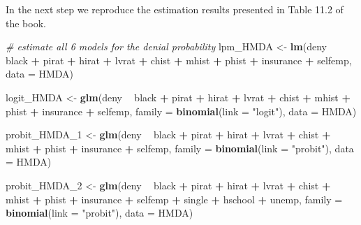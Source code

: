 \documentclass[]{book}
\newenvironment{Shaded}{\begin{snugshade}}{\end{snugshade}}
\newcommand{\KeywordTok}[1]{\textcolor[rgb]{0.13,0.29,0.53}{\textbf{#1}}}
\newcommand{\DataTypeTok}[1]{\textcolor[rgb]{0.13,0.29,0.53}{#1}}
\newcommand{\DecValTok}[1]{\textcolor[rgb]{0.00,0.00,0.81}{#1}}
\newcommand{\StringTok}[1]{\textcolor[rgb]{0.31,0.60,0.02}{#1}}
\newcommand{\CommentTok}[1]{\textcolor[rgb]{0.56,0.35,0.01}{\textit{#1}}}
\newcommand{\OperatorTok}[1]{\textcolor[rgb]{0.81,0.36,0.00}{\textbf{#1}}}
\newcommand{\NormalTok}[1]{#1}
\theoremstyle{definition}
\theoremstyle{definition}
\theoremstyle{definition}
\theoremstyle{remark}
\begin{document}
In the next step we reproduce the estimation results presented in Table
11.2 of the book.

\begin{Shaded}
\begin{Highlighting}[]
\CommentTok{# estimate all 6 models for the denial probability}
\NormalTok{lpm_HMDA <-}\StringTok{ }\KeywordTok{lm}\NormalTok{(deny }\OperatorTok{~}\StringTok{ }\NormalTok{black }\OperatorTok{+}\StringTok{ }\NormalTok{pirat }\OperatorTok{+}\StringTok{ }\NormalTok{hirat }\OperatorTok{+}\StringTok{ }\NormalTok{lvrat }\OperatorTok{+}\StringTok{ }\NormalTok{chist }\OperatorTok{+}\StringTok{ }\NormalTok{mhist }\OperatorTok{+}\StringTok{ }\NormalTok{phist }
               \OperatorTok{+}\StringTok{ }\NormalTok{insurance }\OperatorTok{+}\StringTok{ }\NormalTok{selfemp, }\DataTypeTok{data =}\NormalTok{ HMDA)}

\NormalTok{logit_HMDA <-}\StringTok{ }\KeywordTok{glm}\NormalTok{(deny }\OperatorTok{~}\StringTok{ }\NormalTok{black }\OperatorTok{+}\StringTok{ }\NormalTok{pirat }\OperatorTok{+}\StringTok{ }\NormalTok{hirat }\OperatorTok{+}\StringTok{ }\NormalTok{lvrat }\OperatorTok{+}\StringTok{ }\NormalTok{chist }\OperatorTok{+}\StringTok{ }\NormalTok{mhist }\OperatorTok{+}\StringTok{ }\NormalTok{phist }
                  \OperatorTok{+}\StringTok{ }\NormalTok{insurance }\OperatorTok{+}\StringTok{ }\NormalTok{selfemp, }
                  \DataTypeTok{family =} \KeywordTok{binomial}\NormalTok{(}\DataTypeTok{link =} \StringTok{"logit"}\NormalTok{), }
                  \DataTypeTok{data =}\NormalTok{ HMDA)}

\NormalTok{probit_HMDA_}\DecValTok{1}\NormalTok{ <-}\StringTok{ }\KeywordTok{glm}\NormalTok{(deny }\OperatorTok{~}\StringTok{ }\NormalTok{black }\OperatorTok{+}\StringTok{ }\NormalTok{pirat }\OperatorTok{+}\StringTok{ }\NormalTok{hirat }\OperatorTok{+}\StringTok{ }\NormalTok{lvrat }\OperatorTok{+}\StringTok{ }\NormalTok{chist }\OperatorTok{+}\StringTok{ }\NormalTok{mhist }\OperatorTok{+}\StringTok{ }\NormalTok{phist }
                     \OperatorTok{+}\StringTok{ }\NormalTok{insurance }\OperatorTok{+}\StringTok{ }\NormalTok{selfemp, }
                     \DataTypeTok{family =} \KeywordTok{binomial}\NormalTok{(}\DataTypeTok{link =} \StringTok{"probit"}\NormalTok{), }
                     \DataTypeTok{data =}\NormalTok{ HMDA)}

\NormalTok{probit_HMDA_}\DecValTok{2}\NormalTok{ <-}\StringTok{ }\KeywordTok{glm}\NormalTok{(deny }\OperatorTok{~}\StringTok{ }\NormalTok{black }\OperatorTok{+}\StringTok{ }\NormalTok{pirat }\OperatorTok{+}\StringTok{ }\NormalTok{hirat }\OperatorTok{+}\StringTok{ }\NormalTok{lvrat }\OperatorTok{+}\StringTok{ }\NormalTok{chist }\OperatorTok{+}\StringTok{ }\NormalTok{mhist }\OperatorTok{+}\StringTok{ }\NormalTok{phist }
                     \OperatorTok{+}\StringTok{ }\NormalTok{insurance }\OperatorTok{+}\StringTok{ }\NormalTok{selfemp }\OperatorTok{+}\StringTok{ }\NormalTok{single }\OperatorTok{+}\StringTok{ }\NormalTok{hschool }\OperatorTok{+}\StringTok{ }\NormalTok{unemp, }
                     \DataTypeTok{family =} \KeywordTok{binomial}\NormalTok{(}\DataTypeTok{link =} \StringTok{"probit"}\NormalTok{), }
                     \DataTypeTok{data =}\NormalTok{ HMDA)}


\end{Highlighting}
\end{Shaded}
\end{document}

